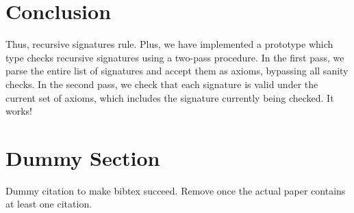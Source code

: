 \documentclass{article}
\begin{document}
\section{Conclusion}\label{Conclusion}
Thus, recursive signatures rule. Plus, we have implemented a prototype which type checks recursive signatures using a two-pass procedure. In the first pass, we parse the entire list of signatures and accept them as axioms, bypassing all sanity checks. In the second pass, we check that each signature is valid under the current set of axioms, which includes the signature currently being checked. It works!

\section{Dummy Section}
Dummy citation \cite{kienzle2006challenge} to make bibtex succeed. Remove once the actual paper contains at least one citation.



\end{document}
